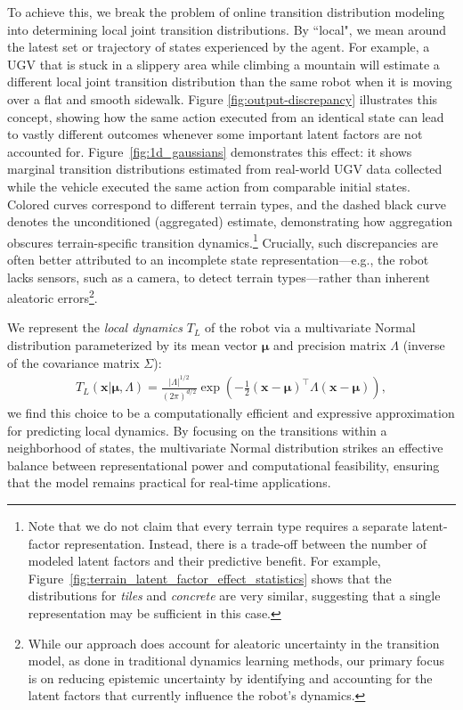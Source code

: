 \documentclass[Afour,sageh,times]{sagej}
\theoremstyle{lemma}
\begin{document}
To achieve this, we break the problem of online transition distribution modeling into determining local joint transition distributions. By ``local", we mean around the latest set or trajectory of states experienced by the agent. For example, a UGV that is stuck in a slippery area while climbing a mountain will estimate a different local joint transition distribution than the same robot when it is moving over a flat and smooth sidewalk. Figure \ref{fig:output-discrepancy} illustrates this concept, showing how the same action executed from an identical state can lead to vastly different outcomes whenever some important latent factors are not accounted for. Figure~\ref{fig:1d_gaussians} demonstrates this effect: it shows marginal transition distributions estimated from real-world UGV data collected while the vehicle executed the same action from comparable initial states. Colored curves correspond to different terrain types, and the dashed black curve denotes the unconditioned (aggregated) estimate, demonstrating how aggregation obscures terrain-specific transition dynamics.\footnote{Note that we do not claim that every terrain type requires a separate latent-factor representation. Instead, there is a trade-off between the number of modeled latent factors and their predictive benefit. For example, Figure~\ref{fig:terrain_latent_factor_effect_statistics} shows that the distributions for \textit{tiles} and \textit{concrete} are very similar, suggesting that a single representation may be sufficient in this case.} Crucially, such discrepancies are often better attributed to an incomplete state representation—e.g., the robot lacks sensors, such as a camera, to detect terrain types—rather than inherent aleatoric errors\footnote{While our approach does account for aleatoric uncertainty in the transition model, as done in traditional dynamics learning methods, our primary focus is on reducing epistemic uncertainty by identifying and accounting for the latent factors that currently influence the robot's dynamics.}.

We represent the {\em local dynamics} $T_L$ of the robot via a multivariate Normal distribution parameterized by its mean vector $\boldsymbol{\mu}$ and precision matrix $\Lambda$ (inverse of the covariance matrix $\Sigma$):
\begin{align} \label{eq:local-dynamics-model}
     T_L(\boldsymbol{x} | \boldsymbol{\mu}, \Lambda) = \frac{|\Lambda|^{1/2}}{(2 \pi)^{d/2}} \exp{ \left( -\frac{1}{2} (\boldsymbol{x} - \boldsymbol{\mu})^\top \Lambda (\boldsymbol{x} - \boldsymbol{\mu}) \right) },
\end{align}
we find this choice to be a computationally efficient and expressive approximation for predicting local dynamics. 
By focusing on the transitions within a neighborhood of states, the multivariate Normal distribution strikes an effective balance between representational power and computational feasibility, ensuring that the model remains practical for real-time applications.
\end{document}

